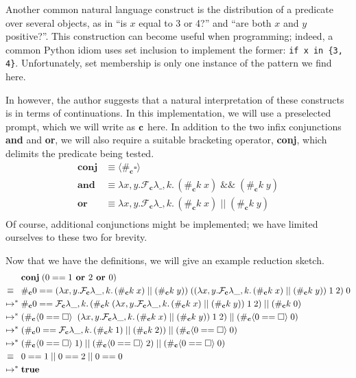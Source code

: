 \documentclass[11pt]{article}
\newcommand\x{\lambda x}
\newcommand\F{\mathcal{F}}
\newcommand{\angles}[1]{\langle#1\rangle}
\begin{document}
Another common natural language construct is the distribution of a predicate over several objects, as in ``is $x$ equal to 3 or 4?'' and ``are both $x$ and $y$ positive?''.
This construction can become useful when programming;
indeed, a common Python idiom uses set inclusion to implement the former: \texttt{if x in \{3, 4\}}.
Unfortunately, set membership is only one instance of the pattern we find here.

In \cite{ContInNatlang} however, the author suggests that a natural interpretation of these constructs is in terms of continuations.
In this implementation, we will use a preselected prompt, which we will write as $\textbf c$ here.
In addition to the two infix conjunctions \textbf{and} and \textbf{or}, we will also require a suitable bracketing operator, \textbf{conj}, which delimits the predicate being tested.
\begin{align*}
\textbf{conj} &\equiv \angles{\#_\textbf{c}\square} \\
\textbf{and} &\equiv \x,y. \F_\textbf{c}\lambda \_, k.\,(\#_\textbf{c}k\;x)\;\&\&\;(\#_\textbf{c}k\;y) \\
\textbf{or} &\equiv \x,y. \F_\textbf{c}\lambda \_, k.\,(\#_\textbf{c}k\;x)\;||\;(\#_\textbf{c}k\;y) \\
\end{align*}
Of course, additional conjunctions might be implemented; we have limited ourselves to these two for brevity.

Now that we have the definitions, we will give an example reduction sketch.
\begin{align*}
&\textbf{conj}\;(0 == 1\textbf{ or }2\textbf{ or }0) \\
\equiv{}\;\;& \#_\textbf c 0 ==
	(\x,y. \F_\textbf{c}\lambda \_, k.\,(\#_\textbf{c}k\;x)\;||\;(\#_\textbf{c}k\;y))
		\;((\x,y. \F_\textbf{c}\lambda \_, k.\,(\#_\textbf{c}k\;x)\;||\;(\#_\textbf{c}k\;y))
			\;1\;2)
		\;0 \\
%
\mapsto^*{}& \#_\textbf c 0 == \F_\textbf{c}\lambda \_, k.\,(\#_\textbf{c}k\;(\x,y. \F_\textbf{c}\lambda \_, k.\,(\#_\textbf{c}k\;x)\;||\;(\#_\textbf{c}k\;y))
			\;1\;2)\;||\;(\#_\textbf{c}k\;0)\\
%
\mapsto^*{}& (\#_\textbf{c}\angles{0==\square}\;\;(\x,y. \F_\textbf{c}\lambda \_, k.\,(\#_\textbf{c}k\;x)\;||\;(\#_\textbf{c}k\;y))
			\;1\;2)\;||\;(\#_\textbf{c}\angles{0==\square}\;0)\\
%
\mapsto^*{}& (\#_\textbf c 0==\F_\textbf{c}\lambda \_, k.\,(\#_\textbf c k\;1)\;||\;(\#_\textbf c k\;2))
			\;||\;(\#_\textbf c \angles{0==\square}\;0)\\
%
\mapsto^*{}& (\#_\textbf c \angles{0==\square}\;1)\;||\;(\#_\textbf c \angles{0==\square}\;2)\;||\;(\#_\textbf c \angles{0==\square}\;0)\\
\equiv{}\;\;& 0==1\;||\;0==2\;||\;0==0\\
%
\mapsto^*{}& \textbf{true}
\end{align*}
\end{document}
